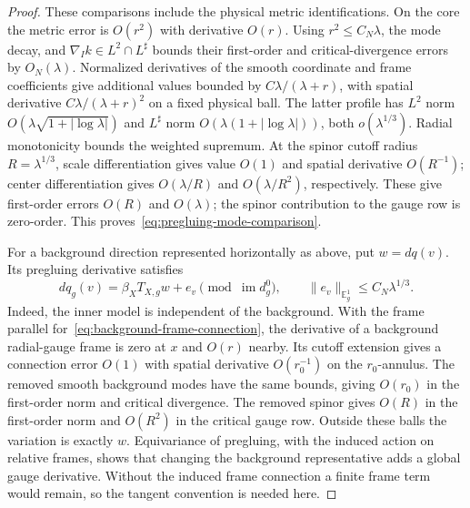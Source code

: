 \documentclass[11pt]{amsart}
\theoremstyle{definition}
\theoremstyle{remark}
\theoremstyle{plain}
\begin{document}
\begin{proof}
These comparisons include the physical metric identifications.
On the core the metric error is $O(r^2)$ with derivative $O(r)$.
Using $r^2\leq C_N\lambda$, the mode decay, and
$\nabla_Ik\in L^2\cap L^\sharp$ bounds their first-order and
critical-divergence errors by $O_N(\lambda)$.
Normalized derivatives of the smooth coordinate and frame coefficients
give additional values bounded by $C\lambda/(\lambda+r)$, with
spatial derivative $C\lambda/(\lambda+r)^2$ on a fixed physical ball.
The latter profile has $L^2$ norm
$O(\lambda\sqrt{1+|\log\lambda|})$ and $L^\sharp$ norm
$O(\lambda(1+|\log\lambda|))$, both $o(\lambda^{1/3})$.
Radial monotonicity bounds the weighted supremum.
At the spinor cutoff radius $R=\lambda^{1/3}$, scale differentiation
gives value $O(1)$ and spatial derivative $O(R^{-1})$;
center differentiation gives $O(\lambda/R)$ and
$O(\lambda/R^2)$, respectively.  These give first-order errors
$O(R)$ and $O(\lambda)$; the spinor contribution to the gauge row
is zero-order.  This proves~\eqref{eq:pregluing-mode-comparison}.

For a background direction represented horizontally as above, put
$w=dq(v)$.  Its pregluing derivative satisfies
\begin{equation}\label{eq:background-mode-comparison}
 dq_g(v)=\beta_XT_{X,g}w+e_v
       \pmod{\operatorname{im}d_g^0},\qquad
 \|e_v\|_{\mathbb E_g^1}\leq C_N\lambda^{1/3}.
\end{equation}
Indeed, the inner model is independent of the background.  With the
frame parallel for~\eqref{eq:background-frame-connection}, the derivative
of a background radial-gauge frame is zero at $x$ and $O(r)$ nearby.
Its cutoff extension gives a connection error $O(1)$ with spatial
derivative $O(r_0^{-1})$ on the $r_0$-annulus.
The removed smooth background modes have the same bounds, giving
$O(r_0)$ in the first-order norm and critical divergence.
The removed spinor gives $O(R)$ in the first-order norm and
$O(R^2)$ in the critical gauge row.  Outside these balls the variation
is exactly $w$.
Equivariance of pregluing, with the induced action on relative frames,
shows that changing the background representative adds a global gauge
derivative.  Without the induced frame connection a finite frame term
would remain, so the tangent convention is needed here.


\end{proof}
\end{document}
